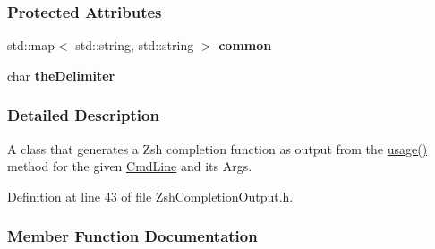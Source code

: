 \subsubsection*{Protected Attributes}
\begin{DoxyCompactItemize}
\item 
std\+::map$<$ std\+::string, std\+::string $>$ {\bfseries common}\hypertarget{classTCLAP_1_1ZshCompletionOutput_aaa1f1d51a31c32ca28df97c951aaad81}{}\label{classTCLAP_1_1ZshCompletionOutput_aaa1f1d51a31c32ca28df97c951aaad81}

\item 
char {\bfseries the\+Delimiter}\hypertarget{classTCLAP_1_1ZshCompletionOutput_a170dd4ecb233984f3e2b6f853c82b1b0}{}\label{classTCLAP_1_1ZshCompletionOutput_a170dd4ecb233984f3e2b6f853c82b1b0}

\end{DoxyCompactItemize}


\subsubsection{Detailed Description}
A class that generates a Zsh completion function as output from the \hyperlink{classTCLAP_1_1ZshCompletionOutput_a3ea685b174fce7ddf2353129863b49d7}{usage()} method for the given \hyperlink{classTCLAP_1_1CmdLine}{Cmd\+Line} and its Args. 

Definition at line 43 of file Zsh\+Completion\+Output.\+h.



\subsubsection{Member Function Documentation}
